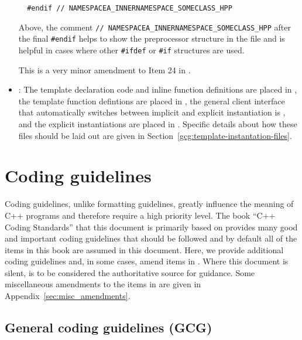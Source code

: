 \begin{itemize}
{\begin{verbatim}
  #endif // NAMESPACEA_INNERNAMESPACE_SOMECLASS_HPP
\end{verbatim}}

Above, the comment {}\texttt{//
NAMESPACEA\-\_INNERNAMESPACE\-\_SOMECLASS\-\_HPP} after the final
{}\texttt{\#endif} helps to show the preprocessor structure in the file and is
helpful in cases where other {}\texttt{\#ifdef} or {}\texttt{\#if} structures
are used.

This is a very minor amendment to Item 24 in {}\cite{C++CodingStandards05}.


{}\item\NOSFTemplateFiles: The template declaration code and inline function
definitions are placed in {}, the template function
defintions are placed in {}, the general client
interface that automatically switches between implicit and explicit
instantiation is {}, and the explicit instantiations are
placed in {}.  Specific details about how these files should
be laid out are given in Section~\ref{gcg:template-instantation-files}.


\end{itemize}


%
\section{Coding guidelines}
\label{thyracodingguidelines:codingguidelines:sec}
%

Coding guidelines, unlike formatting guidelines, greatly influence the meaning
of C++ programs and therefore require a high priority level.  The book ``C++
Coding Standards'' {}\cite{C++CodingStandards05} that this document is
primarily based on provides many good and important coding guidelines that
should be followed and by default all of the items in this book are assumed in
this document.  Here, we provide additional coding guidelines and, in some
cases, amend items in {}\cite{C++CodingStandards05}.  Where this document is
silent, {}\cite{C++CodingStandards05} is to be considered the authoritative
source for guidance.  Some miscellaneous amendments to the items in
{}\cite{C++CodingStandards05} are given in Appendix~\ref{sec:misc_amendments}.


%
\subsection{General coding guidelines (GCG)}
%

